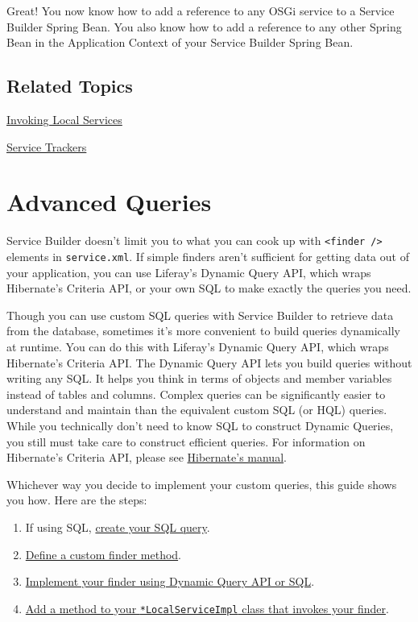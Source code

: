 Great! You now know how to add a reference to any OSGi service to a
Service Builder Spring Bean. You also know how to add a reference to any
other Spring Bean in the Application Context of your Service Builder
Spring Bean.

\section{Related Topics}\label{related-topics-22}

\href{/docs/7-2/appdev/-/knowledge_base/a/invoking-local-services}{Invoking
Local Services}

\href{/docs/7-2/frameworks/-/knowledge_base/f/using-a-service-tracker}{Service
Trackers}

\chapter{Advanced Queries}\label{advanced-queries}

Service Builder doesn't limit you to what you can cook up with
\texttt{\textless{}finder\ /\textgreater{}} elements in
\texttt{service.xml}. If simple finders aren't sufficient for getting
data out of your application, you can use Liferay's Dynamic Query API,
which wraps Hibernate's Criteria API, or your own SQL to make exactly
the queries you need.

Though you can use custom SQL queries with Service Builder to retrieve
data from the database, sometimes it's more convenient to build queries
dynamically at runtime. You can do this with Liferay's Dynamic Query
API, which wraps Hibernate's Criteria API. The Dynamic Query API lets
you build queries without writing any SQL. It helps you think in terms
of objects and member variables instead of tables and columns. Complex
queries can be significantly easier to understand and maintain than the
equivalent custom SQL (or HQL) queries. While you technically don't need
to know SQL to construct Dynamic Queries, you still must take care to
construct efficient queries. For information on Hibernate's Criteria
API, please see
\href{http://docs.jboss.org/hibernate/orm/5.0/userguide/html_single/chapters/query/criteria/Criteria.html}{Hibernate's
manual}.

Whichever way you decide to implement your custom queries, this guide
shows you how. Here are the steps:

\begin{enumerate}
\def\labelenumi{\arabic{enumi}.}
\item
  If using SQL,
  \href{/docs/7-2/appdev/-/knowledge_base/a/custom-sql}{create your SQL
  query}.
\item
  \href{/docs/7-2/appdev/-/knowledge_base/a/defining-a-custom-finder-method}{Define
  a custom finder method}.
\item
  \href{/docs/7-2/appdev/-/knowledge_base/a/dynamic-query}{Implement
  your finder using Dynamic Query API or SQL}.
\item
  \href{/docs/7-2/appdev/-/knowledge_base/a/accessing-your-custom-finder-method-from-the-service-layer}{Add
  a method to your \texttt{*LocalServiceImpl} class that invokes your
  finder}.
\end{enumerate}

